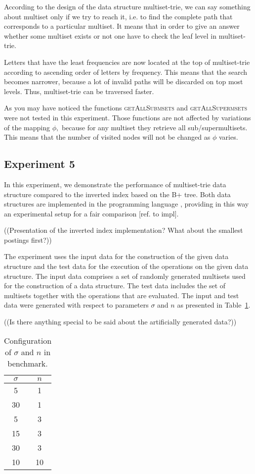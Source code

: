 According to the design of the data structure multiset-trie, we can say 
something about multiset only if we try to reach it, i.e. to find the complete 
path that corresponds to a particular multiset. It means that in order to give 
an answer whether some multiset exists or not one have to check the leaf level in 
multiset-trie. 

Letters that have the least frequencies are now located at the top of 
multiset-trie according to ascending order of letters by frequency. This means 
that the search becomes narrower, because a lot of invalid paths will be 
discarded on top most levels. Thus, multiset-trie can be traversed faster.

As you may have noticed the functions \textsc{getAllSubmsets} and 
\textsc{getAllSupermsets} were not tested in this experiment. Those functions 
are not affected by variations of the mapping $\phi,$ because for any multiset 
they retrieve all sub/supermultisets. This means that the number of visited 
nodes will not be changed as $\phi$ varies.

\subsection{Experiment 5} \label{s:exp5}
In this experiment, we demonstrate the performance of multiset-trie data structure compared to the inverted index based on the B+ tree. Both data structures are implemented in the programming language \CC, providing in this way an experimental setup for a fair comparison  [ref. to impl].

((Presentation of the inverted index implementation? What about the smallest postings first?))

The experiment uses the input data for the construction of the given data structure and the test data for the execution of the operations on the given data structure. The input data comprises a set of randomly generated multisets used for the construction of a data structure. The test data includes the set of multisets together with the operations that are evaluated. The input and test data were generated with respect to parameters $\sigma$ and $n$ as presented in Table~\ref{t:benchmark}.

((Is there anything special to be said about the artificially generated data?))

\begin{table}[h]
\center
\begin{tabular}{|c|c|}
\hline
$\sigma$ & $n$ \\
\hline
5		& 1\\
\hline
30	& 1 \\
\hline
5		& 3 \\
\hline
15	& 3 \\
\hline
30	& 3 \\
\hline
10	& 10 \\
\hline
\end{tabular}
\caption{Configuration of $\sigma$ and $n$ in benchmark.}
\label{t:benchmark}
\end{table}

